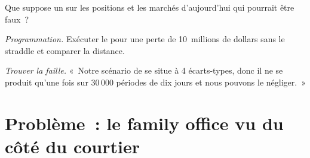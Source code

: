 \begin{exercise}[$\star\star$]\label{exo:rc:stress-testing-and-scenarios:6}
Que suppose un  sur les positions et les marchés d'aujourd'hui qui pourrait être faux~?
\end{exercise}

\begin{exercise}[$\star\star\star$]\label{exo:rc:stress-testing-and-scenarios:7}
\emph{Programmation.} Exécuter le  pour une perte de 10~millions de dollars sans le straddle et
comparer la distance.
\end{exercise}

\begin{exercise}[$\star\star\star$]\label{exo:rc:stress-testing-and-scenarios:8}
\emph{Trouver la faille.} «~Notre scénario de  se situe à 4 écarts-types, donc il
ne se produit qu'une fois sur 30\,000 périodes de dix jours et nous pouvons le négliger.~»
\end{exercise}

\section{Problème~: le family office vu du côté du courtier}

